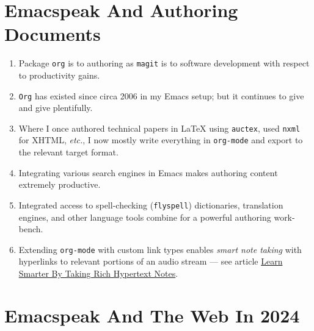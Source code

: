 \documentclass[11pt]{article}
\begin{document}
\section{Emacspeak And Authoring Documents}
\label{sec:orgeb69b22}

\begin{enumerate}
\item Package \texttt{org} is to authoring as \texttt{magit} is to
software development with respect  to productivity gains.
\item \texttt{Org} has existed since circa 2006 in my Emacs setup; but it
continues to give and give plentifully.
\item Where I once authored technical papers in \LaTeX{} using \texttt{auctex},
used \texttt{nxml} for
XHTML,  \emph{etc.}, I now mostly write everything in \texttt{org-mode} and export
to the relevant target format.
\item Integrating various search engines  in Emacs makes authoring content extremely productive.
\item Integrated access to spell-checking (\texttt{flyspell}) dictionaries, translation engines, and other
language tools combine for a powerful authoring work-bench.
\item Extending \texttt{org-mode} with custom link types enables \emph{smart note
taking} with hyperlinks to relevant portions of an audio stream
--- see article \href{https://emacspeak.blogspot.com/2022/10/learn-smarter-by-taking-rich-hypertext.html}{Learn Smarter By Taking Rich Hypertext Notes}.
\end{enumerate}
\section{Emacspeak  And The Web In 2024}
\label{sec:org812a487}
\end{document}
